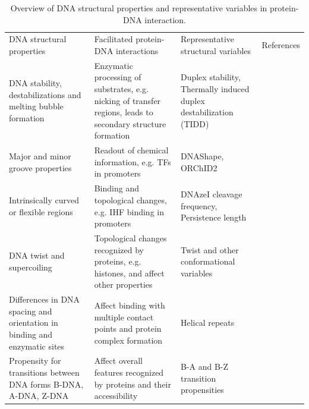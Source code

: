 \documentclass[10pt]{article}
\begin{document}
\begin{table}
\footnotesize
  \caption{Overview of DNA structural properties and representative variables in protein-DNA interaction.}
  \begin{tabular}{p{3cm}|p{3cm}|p{3cm}|p{1cm}}
    \hline
    DNA structural properties & Facilitated protein-DNA interactions & Representative structural variables & References\\
    DNA stability, destabilizations and melting bubble formation & Enzymatic processing of substrates, e.g. nicking of transfer regions, leads to secondary structure formation & Duplex stability, Thermally induced duplex destabilization (TIDD) & \cite{SantaLucia1998-hc,Lucas2010-gi,Zrimec2015-xf,Sut2009-kg}\\
    \hline
    Major and minor groove properties & Readout of chemical information, e.g. TFs in promoters & DNAShape, ORChID2 & \cite{Rohs2009-hm,Chiu2016-kb,Bishop2011-jm,Watson2008-dt}\\
    \hline
    Intrinsically curved or flexible regions & Binding and topological changes, e.g. IHF binding in promoters & DNAzeI cleavage frequency, Persistence length & \cite{Brukner1995-pt,Geggier2010-mw,Moncalian1999-qj}\\
    \hline
    DNA twist and supercoiling & Topological changes recognized by proteins, e.g. histones, and affect other properties & Twist and other conformational variables & \cite{Karas1996-qz,Olson1998-rw,Perez2004-sx,Watson2008-dt}\\
    \hline
    Differences in DNA spacing and orientation in binding and enzymatic sites & Affect binding with multiple contact points and protein complex formation & Helical repeats & \cite{Williams2007-be,Geggier2010-mw,Watson2008-dt}\\
    \hline
    Propensity for transitions between DNA forms B-DNA, A-DNA, Z-DNA & Affect overall features recognized by proteins and their accessibility & B-A and B-Z transition propensities & \cite{Aida1988-iq,Ho1986-hg,Hartmann1989-ji,Kulkarni2013-xm}\\
    \hline
  \end{tabular}
\end{table}
\end{document}
